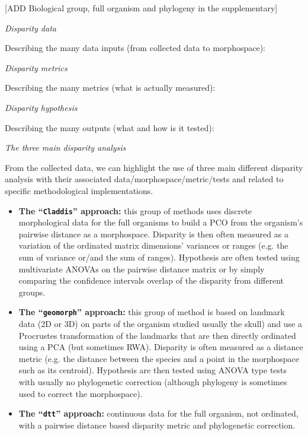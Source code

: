 \documentclass[12pt,letterpaper]{article}
\renewcommand{\subsection}[1]{%
\bigskip
\begin{center}
\begin{large}
\normalfont\itshape #1
\end{large}
\end{center}}
\begin{document}
[ADD Biological group, full organism and phylogeny in the supplementary]


\subsection{Disparity data}
Describing the many data inputs (from collected data to morphospace):

\subsection{Disparity metrics}
Describing the many metrics (what is actually measured):

\subsection{Disparity hypothesis}
Describing the many outputs (what and how is it tested):

\subsection{The three main disparity analysis}
From the collected data, we can highlight the use of three main different disparity analysis with their associated data/morphospace/metric/tests and related to specific methodological implementations.

\begin{itemize}
    \item \textbf{The ``\texttt{Claddis}'' approach:} this group of methods uses discrete morphological data for the full organisms to build a PCO from the organism's pairwise distance as a morphospace. Disparity is then often measured as a variation of the ordinated matrix dimensions' variances or ranges (e.g. the sum of variance or/and the sum of ranges). Hypothesis are often tested using multivariate ANOVAs on the pairwise distance matrix or by simply comparing the confidence intervals overlap of the disparity from different groups. 

    \item \textbf{The ``\texttt{geomorph}'' approach:} this group of method is based on landmark data (2D or 3D) on parts of the organism studied usually the skull) and use a Procrustes transformation of the landmarks that are then directly ordinated using a PCA (but sometimes RWA). Disparity is often measured as a distance metric (e.g. the distance between the species and a point in the morphospace such as its centroid). Hypothesis are then tested using ANOVA type tests with usually no phylogenetic correction (although phylogeny is sometimes used to correct the morphospace).

    \item \textbf{The ``\texttt{dtt}'' approach:} continuous data for the full organism, not ordinated, with a pairwise distance based disparity metric and phylogenetic correction.

\end{itemize}
\end{document}
